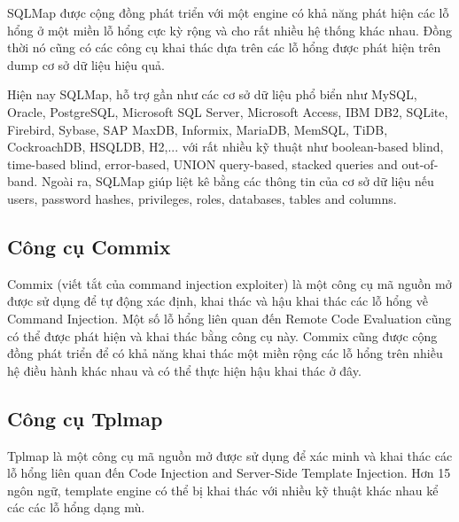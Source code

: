 \documentclass[./../main.tex]{subfiles}
\begin{document}
SQLMap được cộng đồng phát triển với một engine có khả năng phát hiện các lỗ hổng ở một miền lỗ hổng cực kỳ rộng và cho rất nhiều hệ thống khác nhau. Đồng thời nó cũng có các công cụ khai thác dựa trên các lỗ hổng được phát hiện trên dump cơ sở dữ liệu hiệu quả.

Hiện nay SQLMap, hỗ trợ gần như các cơ sở dữ liệu phổ biển như MySQL, Oracle, PostgreSQL, Microsoft SQL Server, Microsoft Access, IBM DB2, SQLite, Firebird, Sybase, SAP MaxDB, Informix, MariaDB, MemSQL, TiDB, CockroachDB, HSQLDB, H2,... với rất nhiều kỹ thuật như boolean-based blind, time-based blind, error-based, UNION query-based, stacked queries and out-of-band. Ngoài ra, SQLMap giúp liệt kê bằng các thông tin của cơ sở dữ liệu nếu users, password hashes, privileges, roles, databases, tables and columns.
\subsection{Công cụ Commix}
Commix (viết tắt của command injection exploiter) là một công cụ mã nguồn mở được sử dụng để tự động xác định, khai thác và hậu khai thác các lỗ hổng về Command Injection. Một số lỗ hổng liên quan đến Remote Code Evaluation cũng có thể được phát hiện và khai thác bằng công cụ này.
Commix cũng được cộng đồng phát triển để có khả năng khai thác một miền rộng các lỗ hổng trên nhiều hệ điều hành khác nhau và có thể thực hiện hậu khai thác ở đây.
\subsection{Công cụ Tplmap}
Tplmap là một công cụ mã nguồn mở được sử dụng để xác minh và khai thác các lỗ hổng liên quan đến Code Injection and Server-Side Template Injection.
Hơn 15 ngôn ngữ, template engine có thể bị khai thác với nhiều kỹ thuật khác nhau kể các các lỗ hổng dạng mù.
\end{document}
